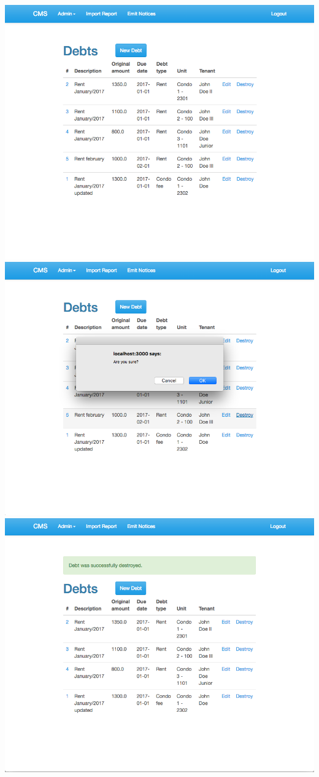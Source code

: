 \begin{itemize}
    \includegraphics[scale=0.25]{./images/ss/debt/delete/2.png}\\
    \includegraphics[scale=0.25]{./images/ss/debt/delete/3.png}
    \includegraphics[scale=0.25]{./images/ss/debt/delete/4.png}
\end{itemize}

